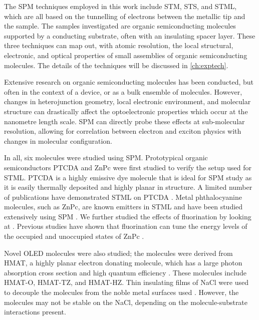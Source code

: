The \ac{SPM} techniques employed in this work include \ac{STM}, \ac{STS}, and \ac{STML}, which are all based on the tunnelling of electrons between the metallic tip and the sample. The samples investigated are organic semiconducting molecules supported by a conducting substrate, often with an insulating spacer layer. These three techniques can map out, with atomic resolution, the local structural, electronic, and optical properties of small assemblies of organic semiconducting molecules. The details of the techniques will be discussed in \autoref{ch:exptech}.

Extensive research on organic semiconducting molecules has been conducted, but often in the context of a device, or as a bulk ensemble of molecules. However, changes in heterojunction geometry, local electronic environment, and molecular structure can drastically affect the optoelectronic properties which occur at the nanometre length scale. \ac{SPM} can directly probe these effects at sub-molecular resolution, allowing for correlation between electron and exciton physics with changes in molecular configuration.

In all, six molecules were studied using \ac{SPM}. Prototypical organic semiconductors \acf{PTCDA} and \acf{ZnPc} were first studied to verify the setup used for \ac{STML}. PTCDA is a highly emissive dye molecule that is ideal for \ac{SPM} study as it is easily thermally deposited and highly planar in structure. A limited number of publications have demonstrated \ac{STML} on \ac{PTCDA} \citep{Cottin2018,Rzeznicka2011,Kimura2019}. Metal phthalocyanine molecules, such as ZnPc, are known emitters in \ac{STML} and have been studied extensively using \ac{SPM} \citep{Imada2016,Zhang2016,Doppagne2017,Miwa2019,cochrane2018molecularly,Kaiser2019,zhang2017sub,Cottin2018}. We further studied the effects of fluorination by looking at . Previous studies have shown that fluorination can tune the energy levels of the occupied and unoccupied states of ZnPc \citep{schwarze2016band}. 

Novel \ac{OLED} molecules were also studied; the molecules were derived from \acf{HMAT}, a highly planar electron donating molecule, which has a large photon absorption cross section and high quantum efficiency \citep{Paisley2020,Tonge2020,Chen2017}. These molecules include \acf{HMAT-O}, \acf{HMAT-TZ}, and \acf{HMAT-HZ}. Thin insulating films of NaCl were used to decouple the molecules from the noble metal surfaces used \citep{repp2005molecules}. However, the molecules may not be stable on the NaCl, depending on the molecule-substrate interactions present.

